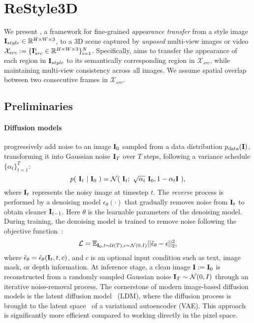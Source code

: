 \section{ReStyle3D}
We present \ours, a framework for fine-grained \textit{appearance transfer} from a style image $\mathbf{I}_{style}\in \mathbb{R}^{H\times W \times3}$, to a 3D scene captured by \textit{unposed} multi-view images or video $\mathcal{X}_{src}:=\{\mathbf{I}^i_{src} \in \mathbb{R}^{H\times W \times3}\}_{i=1}^N$. Specifically, \ours aims to transfer the appearance of each region in $\mathbf{I}_{style}$ to its semantically corresponding region in $\mathcal{X}_{src}$, while maintaining multi-view consistency across all images. We assume spatial overlap between two consecutive frames in $\mathcal{X}_{src}$.



\subsection{Preliminaries}
\paragraph{Diffusion models} progressively add noise to an image $\mathbf{I}_0$ sampled from a data distribution $p_{\mathrm{data}}(\mathbf{I})$, transforming it into Gaussian noise $\mathbf{I}_T$ over $T$ steps, following a variance schedule $\{\alpha_t\}_{t=1}^T$:
\begin{equation}
p(~\mathbf{I}_t~|~\mathbf{I}_0~) = \mathcal{N}(~\mathbf{I}_t;~\sqrt{\alpha_t}~\mathbf{I}_0, 1-\alpha_t\mathbf{I}~),
\end{equation}
where $\mathbf{I}_t$ represents the noisy image at timestep $t$. 
The \textit{reverse} process is performed by a denoising model $\epsilon_\theta(\cdot)$ that gradually removes noise from $\mathbf{I}_t$ to obtain cleaner $\mathbf{I}_{t-1}$. Here $\theta$ is the learnable parameters of the denoising model. During training, the denoising model is trained to remove noise following the objective function~\cite{ho2020ddpm}:
\begin{equation}
\mathcal{L} = \mathbb{E}_{\mathbf{I}_0,t \sim \mathcal{U}(T),\epsilon \sim \mathcal{N}(0, I)}||\hat{\epsilon}_{\theta} - \epsilon||_2^2,
\label{eq:2}
\end{equation}
where $\hat{\epsilon}_{\theta}=\hat{\epsilon}_\theta(\mathbf{I}_t, t, c)$, and $c$ is an optional input condition such as text, image mask, or depth information.
At inference stage, a clean image $\mathbf{I}:=\mathbf{I}_0$ is reconstructed
from a randomly sampled Gaussian noise $\mathbf{I}_T\sim \mathcal{N}(0, I)$ through an iterative noise-removal process. The cornerstone of modern image-based diffusion models is the latent diffusion model~\cite{rombach2022latentdiffusion} (LDM), where the diffusion process is brought to the latent space~\cite{vqgan_2021_CVPR} of a variational autoencoder (VAE). This approach is significantly more efficient compared to working directly in the pixel space. 

